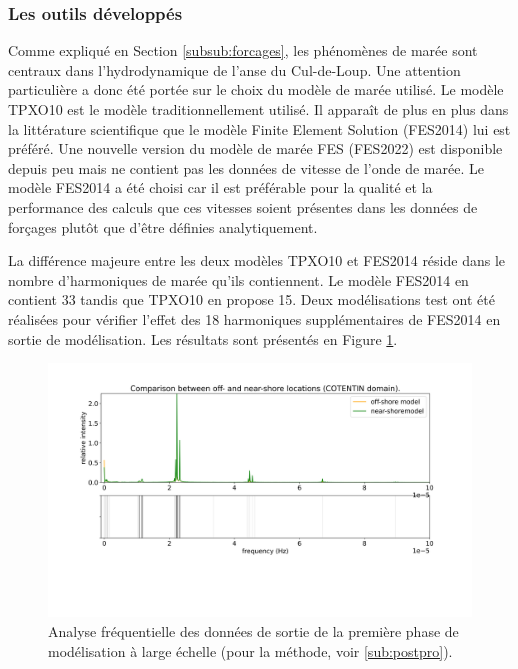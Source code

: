 \documentclass[10pt,a4paper,titlepage]{article}
\begin{document}
\subsubsection{Les outils développés }

Comme expliqué en Section \ref{subsub:forcages}, les phénomènes de marée sont centraux dans l'hydrodynamique de l'anse du Cul-de-Loup.
Une attention particulière a donc été portée sur le choix du modèle de marée utilisé.
Le modèle TPXO10 est le modèle traditionnellement utilisé.
Il apparaît de plus en plus dans la littérature scientifique que le modèle Finite Element Solution (FES2014) lui est préféré.
Une nouvelle version du modèle de marée FES (FES2022) est disponible depuis peu mais ne contient pas les données de vitesse de l'onde de marée.
Le modèle FES2014 a été choisi car il est préférable pour la qualité et la performance des calculs que ces vitesses soient présentes dans les données de forçages plutôt que d'être définies analytiquement.

La différence majeure entre les deux modèles TPXO10 et FES2014 réside dans le nombre d'harmoniques de marée qu'ils contiennent.
Le modèle FES2014 en contient 33 tandis que TPXO10 en propose 15.
Deux modélisations test ont été réalisées pour vérifier l'effet des 18 harmoniques supplémentaires de FES2014 en sortie de modélisation.
Les résultats sont présentés en Figure \ref{fig:ana_freq_cotentin}.

\begin{figure}[h!]
    \centering
    \includegraphics[scale=0.4]{../images/COTENTIN_analyse_off-near-shore.png}
    \caption{
        Analyse fréquentielle des données de sortie de la première phase de modélisation à large échelle (pour la méthode, voir \ref{sub:postpro}).
    }
    \label{fig:ana_freq_cotentin}
\end{figure}
\end{document}
